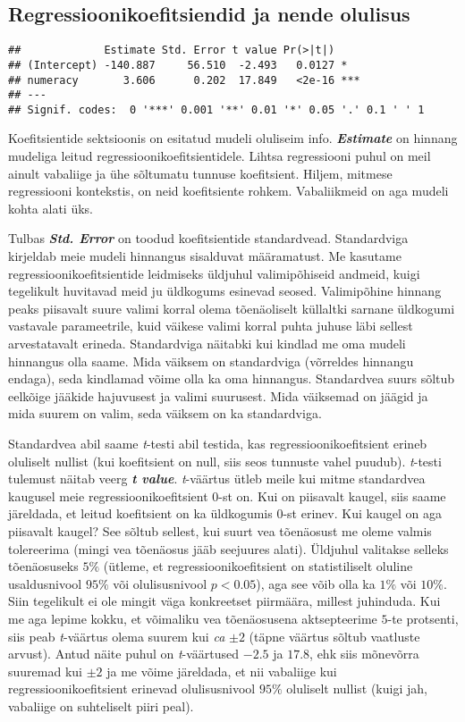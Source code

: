 \documentclass[
]{book}
\begin{document}
\hypertarget{regressioonikoefitsiendid-ja-nende-olulisus}{%
\subsection{Regressioonikoefitsiendid ja nende olulisus}\label{regressioonikoefitsiendid-ja-nende-olulisus}}

\begin{verbatim}
##             Estimate Std. Error t value Pr(>|t|)    
## (Intercept) -140.887     56.510  -2.493   0.0127 *  
## numeracy       3.606      0.202  17.849   <2e-16 ***
## ---
## Signif. codes:  0 '***' 0.001 '**' 0.01 '*' 0.05 '.' 0.1 ' ' 1
\end{verbatim}

Koefitsientide sektsioonis on esitatud mudeli oluliseim info. \textbf{\emph{Estimate}} on hinnang mudeliga leitud regressioonikoefitsientidele. Lihtsa regressiooni puhul on meil ainult vabaliige ja ühe sõltumatu tunnuse koefitsient. Hiljem, mitmese regressiooni kontekstis, on neid koefitsiente rohkem. Vabaliikmeid on aga mudeli kohta alati üks.

Tulbas \textbf{\emph{Std. Error}} on toodud koefitsientide standardvead. Standardviga kirjeldab meie mudeli hinnangus sisalduvat määramatust. Me kasutame regressioonikoefitsientide leidmiseks üldjuhul valimipõhiseid andmeid, kuigi tegelikult huvitavad meid ju üldkogums esinevad seosed. Valimipõhine hinnang peaks piisavalt suure valimi korral olema tõenäoliselt küllaltki sarnane üldkogumi vastavale parameetrile, kuid väikese valimi korral puhta juhuse läbi sellest arvestatavalt erineda. Standardviga näitabki kui kindlad me oma mudeli hinnangus olla saame. Mida väiksem on standardviga (võrreldes hinnangu endaga), seda kindlamad võime olla ka oma hinnangus. Standardvea suurs sõltub eelkõige jääkide hajuvusest ja valimi suurusest. Mida väiksemad on jäägid ja mida suurem on valim, seda väiksem on ka standardviga.

Standardvea abil saame \emph{t}-testi abil testida, kas regressioonikoefitsient erineb oluliselt nullist (kui koefitsient on null, siis seos tunnuste vahel puudub). \emph{t}-testi tulemust näitab veerg \textbf{\emph{t value}}. \emph{t}-väärtus ütleb meile kui mitme standardvea kaugusel meie regressioonikoefitsient 0-st on. Kui on piisavalt kaugel, siis saame järeldada, et leitud koefitsient on ka üldkogumis 0-st erinev. Kui kaugel on aga piisavalt kaugel? See sõltub sellest, kui suurt vea tõenäosust me oleme valmis tolereerima (mingi vea tõenäosus jääb seejuures alati). Üldjuhul valitakse selleks tõenäosuseks \(5\%\) (ütleme, et regressioonikoefitsient on statistiliselt oluline usaldusnivool \(95 \%\) või olulisusnivool \(p < 0.05\)), aga see võib olla ka \(1\%\) või \(10\%\). Siin tegelikult ei ole mingit väga konkreetset piirmäära, millest juhinduda. Kui me aga lepime kokku, et võimaliku vea tõenäosusena aktsepteerime \(5\)-te protsenti, siis peab \emph{t}-väärtus olema suurem kui \emph{ca} \(\pm2\) (täpne väärtus sõltub vaatluste arvust). Antud näite puhul on \emph{t}-väärtused \(-2.5\) ja \(17.8\), ehk siis mõnevõrra suuremad kui \(\pm2\) ja me võime järeldada, et nii vabaliige kui regressioonikoefitsient erinevad olulisusnivool \(95\%\) oluliselt nullist (kuigi jah, vabaliige on suhteliselt piiri peal).
\end{document}

